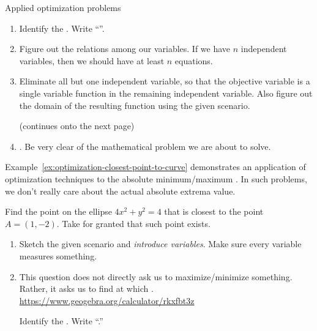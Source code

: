 \documentclass[../main.tex]{subfiles}
\begin{document}
\begin{lesson}{Applied optimization problems}
\begin{example}
\begin{enumerate}
      \item Identify the . Write ``''. 

      \item Figure out the relations among our variables. If we have \(n\) independent variables, then we should have at least \(n\) equations.

      \item Eliminate all but one independent variable, so that the objective variable is a single variable function in the remaining independent variable. Also figure out the domain of the resulting function using the given scenario.

        \vfill{}{\footnotesize (continues onto the next page)} \clearpage

      \item {}. Be very clear of the mathematical problem we are about to solve.
    \end{enumerate}
  \end{example}

  \medskip
  Example~\ref{ex:optimization-closest-point-to-curve} demonstrates an application of optimization techniques to  the absolute minimum/maximum . In such problems, we don't really care about the actual absolute extrema value. 

  \begin{example} \label{ex:optimization-closest-point-to-curve}
    Find the point on the ellipse \(4x^{2} + y^{2} = 4\) that is closest to the point \(A = (1,-2)\). Take for granted that such point exists.

    \begin{enumerate}
      \item Sketch the given scenario and \emph{introduce variables}. Make sure every variable measures something. 

      \item This question does not directly ask us to maximize/minimize something. Rather, it asks us to find \underline{\hspace{1in}} at which \underline{\hspace{2in}}. \url{https://www.geogebra.org/calculator/rkxfbt3z}

        Identify the . Write ``\emph{}.''


\end{enumerate}
\end{example}
\end{lesson}
\end{document}
